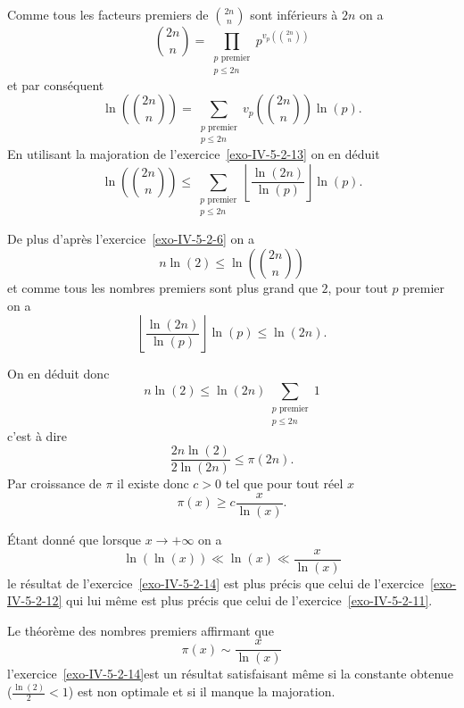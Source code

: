\begin{sol}
    Comme tous les facteurs premiers de $\binom{2n}{n}$ sont inférieurs à $2n$ on a
    \[\binom{2n}{n} = \prod_{\substack{p \text{ premier} \\ p \leq 2n }} p^{v_p \left( \binom{2n}{n}\right)}\]
    et par conséquent
    \[\ln \left( \binom{2n}{n}\right) = \sum_{\substack{p \text{ premier} \\ p \leq 2n }}  v_p \left( \binom{2n}{n}\right)\ln(p).\] 
    En utilisant la majoration de l'exercice~\ref{exo-IV-5-2-13} on en déduit
    \[\boxed{\ln \left( \binom{2n}{n}\right) \leq \sum_{\substack{p \text{ premier} \\ p \leq 2n }} \left\lfloor \frac{\ln(2n)}{\ln(p)} \right\rfloor \ln(p)}.\] 

    De plus d'après l'exercice~\ref{exo-IV-5-2-6} on a 
    \[n \ln(2) \leq \ln \left( \binom{2n}{n}\right)\]
    et comme tous les nombres premiers sont plus grand que $2$, pour tout $p$ premier on a
    \[\left\lfloor \frac{\ln(2n)}{\ln(p)} \right\rfloor \ln(p) \leq  \ln(2n).\]

    On en déduit donc
    \[n \ln(2) \leq \ln(2n) \sum_{\substack{p \text{ premier} \\ p \leq 2n }} 1\]
    c'est à dire
    \[\frac{2 n \ln(2)}{2\ln(2n)} \leq \pi(2n).\]
    Par croissance de $\pi$ il existe donc $c > 0$ tel que pour tout réel $x$
    \[\pi(x) \geq c \frac{x}{\ln(x)}.\]
\end{sol}

\begin{sol}
    Étant donné que lorsque $x \to + \infty$ on a
    \[\ln(\ln(x)) \ll \ln(x) \ll \frac{x}{\ln(x)}\]
    le résultat de l'exercice~\ref{exo-IV-5-2-14} est plus précis que celui de l'exercice~\ref{exo-IV-5-2-12} qui lui même est plus précis que celui de l'exercice~\ref{exo-IV-5-2-11}.

    Le théorème des nombres premiers affirmant que
    \[\pi(x) \sim \frac{x}{\ln(x)}\]
    l'exercice~\ref{exo-IV-5-2-14}est un résultat satisfaisant même si la constante obtenue ($\frac{\ln(2)}{2}< 1$) est non optimale et si il manque la majoration.
\end{sol}